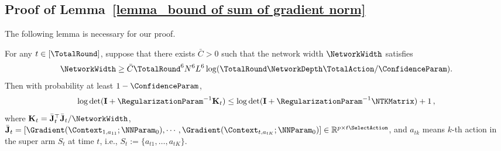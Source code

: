 \documentclass{article}
\theoremstyle{plain}
\begin{document}
\subsection{Proof of Lemma~\ref{lemma_bound of sum of gradient norm}}
The following lemma is necessary for our proof.
\begin{lemma} \label{aux lemma:Lemma B.7 in NeuralTS}
For any $t \in [\TotalRound]$, suppose that there exists $\bar{C} > 0$ such that the network width $\NetworkWidth$ satisfies
%
    \begin{equation*}
        \NetworkWidth \ge \bar{C} \TotalRound^6 N^6 L^6 \log( \TotalRound \NetworkDepth \TotalAction / \ConfidenceParam).
    \end{equation*}
%
Then with probability at least $1-\ConfidenceParam$,
%
    \begin{equation*}
        \log \det (\mathbf{I} + \RegularizationParam^{-1} \mathbf{K}_t )
        \le \log \det (\mathbf{I} + \RegularizationParam^{-1} \NTKMatrix) + 1 \, ,
    \end{equation*}
%
where $\mathbf{K}_t = \bar{\mathbf{J}}_t^\top \bar{\mathbf{J}}_t / \NetworkWidth$, $\bar{\mathbf{J}}_t = \left[ \Gradient (\Context_{1, a_{11}}; \NNParam_{0}), \cdots , \Gradient (\Context_{t, a_{tK}};\NNParam_{0}) \right] \in \mathbb{R}^{p \times t\SelectAction}$, and $a_{tk}$ means $k$-th action in the super arm $S_t$ at time $t$, i.e., $S_t:= \{a_{t1}, \ldots, a_{tK}\}$.
\end{lemma}
\end{document}
